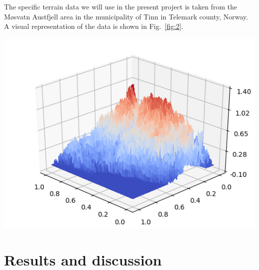 \documentclass[a4paper]{article}
\newcommand{\fig}[1]{Fig.\ \ref{fig:#1}}
\newenvironment{Figure}
  {\par\medskip\noindent\minipage{\linewidth}}
  {\endminipage\par\medskip}
\begin{document}
\begin{multicols}{2}
The specific terrain data we will use in the present project is taken from the Møsvatn Austfjell area in the municipality of Tinn in Telemark county, Norway. A visual representation of the data is shown in \fig{2}. 

\begin{Figure}
\centering
\includegraphics[width=\linewidth]{terrain2.png}
\end{Figure}


\section{Results and discussion}

\end{multicols}
\end{document}
